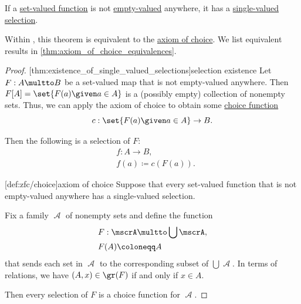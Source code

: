 \begin{theorem}\label{thm:existence_of_single_valued_selections}
  If a \hyperref[def:set_valued_function]{set-valued function} is not \hyperref[def:set_valued_function/value_cardinality/empty]{empty-valued} anywhere, it has a \hyperref[def:set_valued_selection]{single-valued selection}.
\end{theorem}
\begin{comments}
  \item Within \hyperref[def:zfc]{}, this theorem is equivalent to the \hyperref[def:zfc/choice]{axiom of choice}. We list equivalent results in \cref{thm:axiom_of_choice_equivalences}.
\end{comments}
\begin{proof}
  [thm:existence_of_single_valued_selections]{selection existence} Let \( F: A \multto B \) be a set-valued map that is not empty-valued anywhere. Then \( F[A] = \set{ F(a) \given a \in A } \) is a (possibly empty) collection of nonempty sets. Thus, we can apply the axiom of choice to obtain some \hyperref[def:choice_function]{choice function}
  \begin{equation*}
    c: \set{ F(a) \given a \in A } \to B.
  \end{equation*}

  Then the following is a selection of \( F \):
  \begin{equation*}
    \begin{aligned}
      &f: A \to B, \\
      &f(a) \coloneqq c(F(a)).
    \end{aligned}
  \end{equation*}

  [def:zfc/choice]{axiom of choice} Suppose that every set-valued function that is not empty-valued anywhere has a single-valued selection.

  Fix a family \( \mscrA \) of nonempty sets and define the function
  \begin{equation*}
    \begin{aligned}
      &F: \mscrA \multto \bigcup \mscrA, \\
      &F(A) \coloneqq A
    \end{aligned}
  \end{equation*}
  that sends each set in \( \mscrA \) to the corresponding subset of \( \bigcup \mscrA \). In terms of relations, we have \( (A, x) \in \gr(F) \) if and only if \( x \in A \).

  Then every selection of \( F \) is a choice function for \( \mscrA \).
\end{proof}

